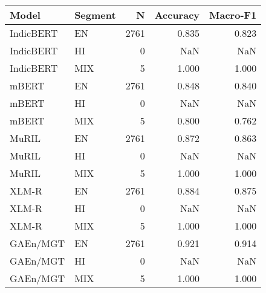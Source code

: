 \begin{tabular}{llrrr}
\toprule
Model & Segment & N & Accuracy & Macro-F1 \\
\midrule
IndicBERT & EN & 2761 & 0.835 & 0.823 \\
IndicBERT & HI & 0 & NaN & NaN \\
IndicBERT & MIX & 5 & 1.000 & 1.000 \\
mBERT & EN & 2761 & 0.848 & 0.840 \\
mBERT & HI & 0 & NaN & NaN \\
mBERT & MIX & 5 & 0.800 & 0.762 \\
MuRIL & EN & 2761 & 0.872 & 0.863 \\
MuRIL & HI & 0 & NaN & NaN \\
MuRIL & MIX & 5 & 1.000 & 1.000 \\
XLM-R & EN & 2761 & 0.884 & 0.875 \\
XLM-R & HI & 0 & NaN & NaN \\
XLM-R & MIX & 5 & 1.000 & 1.000 \\
GAEn/MGT & EN & 2761 & 0.921 & 0.914 \\
GAEn/MGT & HI & 0 & NaN & NaN \\
GAEn/MGT & MIX & 5 & 1.000 & 1.000 \\
\bottomrule
\end{tabular}

